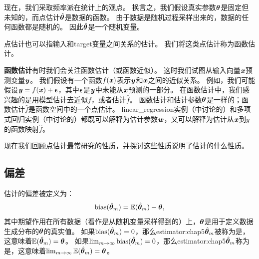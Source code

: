 
现在，我们采取频率派在统计上的观点。
换言之，我们假设真实参数$\boldsymbol{\theta}$是固定但未知的，而点估计$\hat{\boldsymbol{\theta}}$是数据的函数。
由于数据是随机过程采样出来的，数据的任何函数都是随机的。
因此$\hat{\boldsymbol{\theta}}$是一个随机变量。


点估计也可以指输入和\gls{target}变量之间关系的估计。
我们将这类点估计称为函数估计。

\textbf{函数估计}\quad 有时我们会关注函数估计（或函数近似）。
这时我们试图从输入向量$\boldsymbol{\mathit{x}}$预测变量$\boldsymbol{\mathit{y}}$。
我们假设有一个函数$f(\boldsymbol{\mathit{x}})$表示$\boldsymbol{\mathit{y}}$和$\boldsymbol{\mathit{x}}$之间的近似关系。
例如，我们可能假设$\boldsymbol{\mathit{y}} = f(\boldsymbol{\mathit{x}}) + \boldsymbol{\epsilon}$，其中$\boldsymbol{\epsilon}$是$\boldsymbol{\mathit{y}}$中未能从$\boldsymbol{\mathit{x}}$预测的一部分。
在函数估计中，我们感兴趣的是用模型估计去近似$f$，或者估计$\hat{f}$。
函数估计和估计参数$\boldsymbol{\theta}$是一样的；函数估计$\hat{f}$是函数空间中的一个点估计。
\gls{linear_regression}实例（中讨论的）和多项式回归实例（中讨论的）都既可以解释为估计参数$\boldsymbol{\mathit{w}}$，又可以解释为估计从$\boldsymbol{\mathit{x}}$到$y$的函数映射$\hat{f}$。

现在我们回顾点估计最常研究的性质，并探讨这些性质说明了估计的什么性质。

\subsection{偏差}
\label{sec:bias}
估计的偏差被定义为：
\begin{equation}
\label{eq:5.20}
    \text{bias}(\hat{\boldsymbol{\theta}}_m) = \mathbb{E}(\hat{\boldsymbol{\theta}}_m) - \boldsymbol{\theta},
\end{equation}
其中期望作用在所有数据（看作是从随机变量采样得到的）上，$\boldsymbol{\theta}$是用于定义数据生成分布的$\boldsymbol{\theta}$的真实值。
如果$\text{bias}(\hat{\boldsymbol{\theta}}_m)=0$，那么\gls{estimator:chap5}$\hat{\boldsymbol{\theta}}_m$被称为是，这意味着$\mathbb{E}(\hat{\boldsymbol{\theta}}_m) = \boldsymbol{\theta}$。
如果$\lim_{m\to\infty} \text{bias}(\hat{\boldsymbol{\theta}}_m)=0$，那么\gls{estimator:chap5}$\hat{\boldsymbol{\theta}}_m$称为是，这意味着$\lim_{m\to\infty} \mathbb{E}(\hat{\boldsymbol{\theta}}_m) = \boldsymbol{\theta}$。


